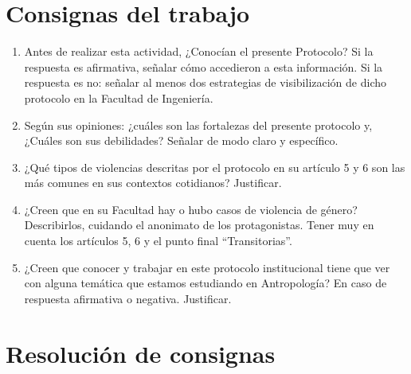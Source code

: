 \documentclass[12pt, a4paper]{article}
\newenvironment{localsize}[1]
{%
  \clearpage
  \let\orignewcommand\newcommand
  \let\newcommand\renewcommand
  \makeatletter
  \makeatother
  \let\newcommand\orignewcommand
}
{%
  \clearpage
}
\begin{document}
  \begin{localsize}{10}
    
  \end{localsize}

  \section*{Consignas del trabajo}

    \begin{enumerate}

      \item Antes de realizar esta actividad, ¿Conocían el presente Protocolo? Si la respuesta es afirmativa, señalar cómo accedieron a esta información. Si la respuesta es no: señalar al menos dos estrategias de visibilización de dicho protocolo en la Facultad de Ingeniería.

      \item Según sus opiniones: ¿cuáles son las fortalezas del presente protocolo y, ¿Cuáles son sus debilidades? Señalar de modo claro y específico.

      \item ¿Qué tipos de violencias descritas por el protocolo en su artículo 5 y 6 son las más comunes en sus contextos cotidianos? Justificar.

      \item ¿Creen que en su Facultad hay o hubo casos de violencia de género? Describirlos, cuidando el anonimato de los protagonistas. Tener muy en cuenta los artículos 5, 6 y el punto final “Transitorias”.

      \item ¿Creen que conocer y trabajar en este protocolo institucional tiene que ver con alguna temática que estamos estudiando en Antropología? En caso de respuesta afirmativa o negativa. Justificar.

  \end{enumerate}

  \vspace{1.5cm}

  \section*{Resolución de consignas}
    
\end{document}
